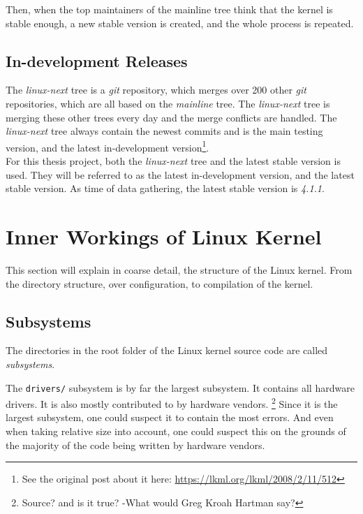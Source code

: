 \documentclass[a4paper,11pt]{report}
\newcommand{\figa}{
    \begin{figure}[!htpb]
    \centering
}
\newcommand{\figb}[2]{
    \caption{#1}
    \label{#2}
    \end{figure}
}
\begin{document}
Then, when the top maintainers of the mainline tree think that the kernel is 
stable enough, a new stable version is created, and the whole process is 
repeated.


        \subsection*{In-development Releases}

The \emph{linux-next} tree is a \emph{git} repository, which 
merges over 200 other \emph{git} repositories\cite
    {nextTrees},
which are all based on the \emph{mainline} tree. The \emph{linux-next} tree is 
merging these other trees every day and the merge conflicts are handled. 
The \emph{linux-next} tree always contain the newest commits and is the main 
testing version, and the latest in-development version\footnote
    {See the original post about it here: 
    \url{https://lkml.org/lkml/2008/2/11/512}}.
\\

For this thesis project, both the \emph{linux-next} tree and the latest stable 
version is used. They will be referred to as the latest in-development version, 
and the latest stable version. As time of data gathering, the latest stable 
version is \emph{4.1.1}.


    \section{Inner Workings of Linux Kernel}

This section will explain in coarse detail, the structure of the Linux kernel.
From the directory structure, over configuration, to compilation of the kernel.


        \subsection{Subsystems}

The directories in the root folder of the Linux kernel source code are called 
\emph{subsystems}. 


The \texttt{drivers/} subsystem is by far the largest subsystem. It contains 
all hardware drivers. It is also mostly contributed to by hardware vendors.
    \footnote{Source? and is it true? -What would Greg Kroah Hartman say?}
Since it is the largest subsystem, one could suspect it to contain the most 
errors. And even when taking relative size into account, one could suspect this
on the grounds of the majority of the code being written by hardware vendors.
\\
\end{document}
